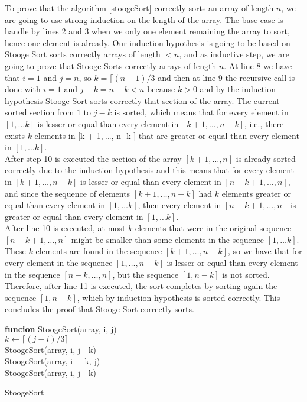 \documentclass[12pt]{scrartcl}
\begin{document}
\begin{enumerate}
To prove that the algorithm \ref{stoogeSort} correctly sorts an array of length $n$, we are going to use strong induction on the length of the array. The base case is handle by lines 2 and 3 when we only one element remaining the array to sort, hence one element is already. Our induction hypothesis is going to be based on Stooge Sort sorts correctly arrays of length $< n$, and as inductive step, we are going to prove that Stooge Sorts correctly arrays of length $n$. At line 8 we have that $i = 1$ and $j = n$, so $k = \lceil (n - 1) / 3$ and then at line 9 the recursive call is done with $i = 1$ and $j - k = n - k < n$ because $k > 0$ and by the induction hypothesis Stooge Sort sorts correctly that section of the array. The current sorted section from $1$ to $j - k$ is sorted, which means that for every element in $[1, \ldots k]$ is lesser or equal than every element in $[k + 1, \ldots, n - k]$, i.e., there exists $k$ elements in [k + 1, \ldots, n -k ] that are greater or equal than every element in $[1, \ldots k]$.\\
	After step 10 is executed the section of the array $[k + 1, \ldots, n]$ is already sorted correctly due to the induction hypothesis and this means that for every element in $[k + 1, \ldots, n - k]$ is lesser or equal than every element in $[n - k + 1, \ldots, n]$, and since the sequence of elements $[k + 1, \ldots, n -k ]$ had $k$ elements greater or equal than every element in $[1, \ldots k]$, then every element in $[n - k + 1, \ldots, n]$ is greater or equal than every element in $[1, \ldots k]$.\\
	After line 10 is executed, at most $k$ elements that were in the original sequence $[n - k + 1, \ldots, n]$ might be smaller than some elements in the sequence $[1, \ldots k]$. These $k$ elements are found in the sequence $[k + 1, \ldots, n - k]$, so we have that for every element in the sequence $[1, \dots, n -k]$ is lesser or equal than every element in the sequence $[n - k, \ldots, n]$, but the sequence $[1, n - k]$ is not sorted. Therefore, after line 11 is executed, the sort completes by sorting again the sequence $[1, n - k]$, which by induction hypothesis is sorted correctly.  This concludes the proof that Stooge Sort correctly sorts. 
	
\begin{algorithm}[th!]
	{\bf funcion} StoogeSort(array, i, j)\\
	$k \leftarrow \lceil (j - i) / 3 \rceil$ \\
	StoogeSort(array, i, j - k)\\
	StoogeSort(array, i + k, j)\\
	StoogeSort(array, i, j - k)
\caption{StoogeSort}
\label{stoogeSort}
\end{algorithm}


\end{enumerate}
\end{document}
